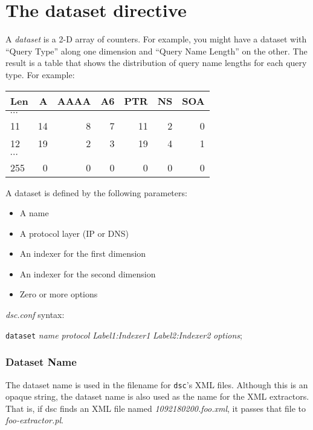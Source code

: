 \documentclass{report}
\def\dsc{{\sc dsc}}
\begin{document}
\section{The dataset directive}

A {\em dataset\/} is a 2-D array of counters.  For example, you
might have a dataset with ``Query Type'' along one dimension and
``Query Name Length'' on the other.  The result is a table that
shows the distribution of query name lengths for each query type.
For example:

\vspace{1ex}
\begin{center}
\begin{tabular}{l|rrrrrr}
Len & A & AAAA & A6 & PTR & NS & SOA \\
\hline
$\cdots$ & & & & & \\
11 & 14 & 8 & 7 & 11 & 2 & 0 \\
12 & 19 & 2 & 3 & 19 & 4 & 1 \\
$\cdots$ & & & & & & \\
255 & 0 & 0 & 0 & 0 & 0 & 0 \\
\hline
\end{tabular}
\end{center}
\vspace{1ex}

\noindent
A dataset is defined by the following parameters:
\begin{itemize}
\item A name
\item A protocol layer (IP or DNS)
\item An indexer for the first dimension
\item An indexer for the second dimension
\item Zero or more options
\end{itemize}

\noindent
{\em dsc.conf\/} syntax:

{\tt dataset\/}
{\em name\/}
{\em protocol\/}
{\em Label1:Indexer1\/}
{\em Label2:Indexer2\/}
{\em options\/};
\vspace{2ex}

\subsubsection{Dataset Name}

The dataset name is used in the filename for {\tt dsc\/}'s XML
files.  Although this is an opaque string, the dataset name is also
used as the name for the XML extractors.  That is, if {\dsc} finds
an XML file named {\em 1092180200.foo.xml\/}, it passes that file
to {\em foo-extractor.pl\/}.
\end{document}

